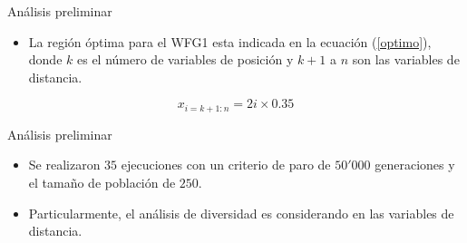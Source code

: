 \documentclass{beamer}
\begin{document}
\begin{frame}{Análisis preliminar}
\begin{itemize}
\justifying
\item La región óptima para el WFG1 esta indicada en la ecuación (\ref{optimo}), donde $k$ es el número de variables de posición y $k+1$ a $n$ son las variables de distancia.
\end{itemize}

\begin{equation} \label{optimo}
	x_{i=k+1:n} = 2i \times 0.35
\end{equation}

\end{frame}

\begin{frame}{Análisis preliminar}
\begin{itemize}
\justifying
\item Se realizaron $35$ ejecuciones con un criterio de paro de $50'000$ generaciones y el tamaño de población de $250$.
\justifying
\item Particularmente, el análisis de diversidad es considerando en las variables de distancia.
\end{itemize} 
\end{frame}
\end{document}
